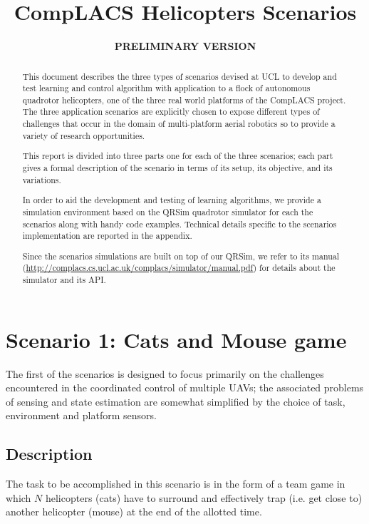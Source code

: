 \documentclass[a4paper,11pt]{report}
\title{{CompLACS} Helicopters Scenarios}
\author{\bf PRELIMINARY VERSION}
\newcommand{\sname}{QRSim\xspace}
\newcommand{\webman}{\url{http://complacs.cs.ucl.ac.uk/complacs/simulator/manual.pdf}\xspace}
\begin{document}
\maketitle



\begin{abstract}
This document describes the three types of scenarios devised at UCL to develop and test learning and control algorithm with application to a flock of autonomous quadrotor helicopters, one of the three real world platforms of the {CompLACS} project.
The three application scenarios are explicitly chosen to expose different types of challenges that occur in the domain of multi-platform aerial robotics so to provide a variety of research opportunities.

This report is divided into three parts one for each of the three scenarios; each part gives a formal description of the scenario in terms of its setup, its objective, and its variations. 

In order to aid the development and testing of learning algorithms, we provide a simulation environment based on the \sname quadrotor simulator for each the scenarios along with handy code examples.
Technical details specific to the scenarios implementation are reported in the appendix. 

Since the scenarios simulations are built on top of our \sname, we refer to its manual (\webman) for details about the simulator and its API.

\end{abstract}

\tableofcontents

\chapter{Scenario 1: Cats and Mouse game}

The first of the scenarios is designed to focus primarily on the challenges encountered in the coordinated control of multiple UAVs; the associated problems of sensing and state estimation are somewhat simplified by the choice of task, environment and platform sensors. 

\section{Description}
The task to be accomplished in this scenario is in the form of a team game in which $N$ helicopters (cats) have to surround and effectively trap (i.e. get close to) another helicopter (mouse) at the end of the allotted time. 
\end{document}
